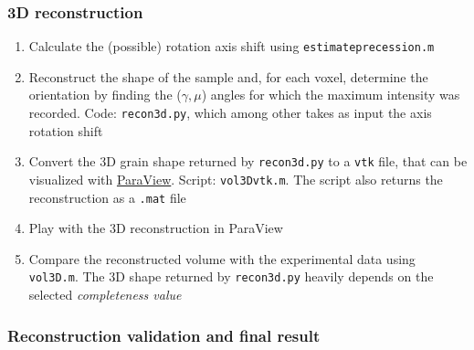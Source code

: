 \documentclass[11pt]{scrartcl}
\begin{document}
\subsubsection{3D reconstruction}

\begin{enumerate}
    \item Calculate the (possible) rotation axis shift using {\texttt{estimate\textunderscore precession.m}}
    \item Reconstruct the shape of the sample and, for each voxel, determine the orientation by finding the ($\gamma, \mu$) angles for which the maximum intensity was recorded. Code: {\texttt{recon3d.py}}, which among other takes as input the axis rotation shift
    \item Convert the {\footnotesize{3D}} grain shape returned by {\texttt{recon3d.py}} to a {\texttt{vtk}} file, that can be visualized with \href{https://www.paraview.org/}{ParaView}. Script: {\texttt{vol3D\textunderscore vtk.m}}. The script also returns the reconstruction as a {\texttt{.mat}} file
    \item Play with the {\footnotesize{3D}} reconstruction in ParaView
    \item Compare the reconstructed volume with the experimental data using {\texttt{vol3D.m}}. The {\footnotesize{3D}} shape returned by {\texttt{recon3d.py}} heavily depends on the selected {\emph{completeness value}}
\end{enumerate}

\subsubsection{Reconstruction validation and final result}
\end{document}
